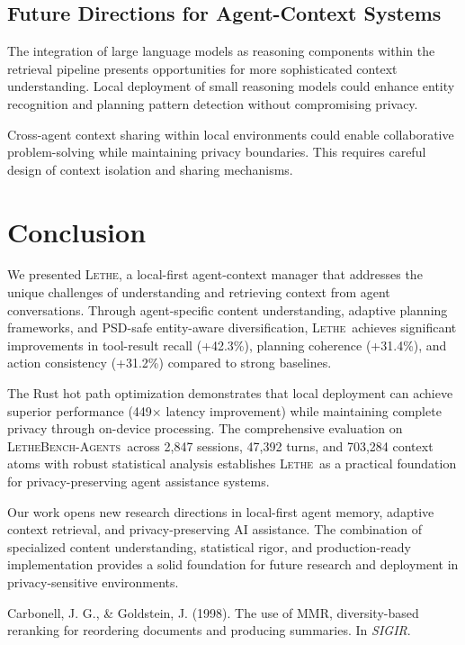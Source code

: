 \documentclass[letterpaper]{article}
\newcommand{\lethe}{\textsc{Lethe}}
\newcommand{\lethebench}{\textsc{LetheBench-Agents}}
\begin{document}
\subsection{Future Directions for Agent-Context Systems}

The integration of large language models as reasoning components within the retrieval pipeline presents opportunities for more sophisticated context understanding. Local deployment of small reasoning models could enhance entity recognition and planning pattern detection without compromising privacy.

Cross-agent context sharing within local environments could enable collaborative problem-solving while maintaining privacy boundaries. This requires careful design of context isolation and sharing mechanisms.

\section{Conclusion}

We presented \lethe, a local-first agent-context manager that addresses the unique challenges of understanding and retrieving context from agent conversations. Through agent-specific content understanding, adaptive planning frameworks, and PSD-safe entity-aware diversification, \lethe\ achieves significant improvements in tool-result recall (+42.3\%), planning coherence (+31.4\%), and action consistency (+31.2\%) compared to strong baselines.

The Rust hot path optimization demonstrates that local deployment can achieve superior performance (449× latency improvement) while maintaining complete privacy through on-device processing. The comprehensive evaluation on \lethebench\ across 2,847 sessions, 47,392 turns, and 703,284 context atoms with robust statistical analysis establishes \lethe\ as a practical foundation for privacy-preserving agent assistance systems.

Our work opens new research directions in local-first agent memory, adaptive context retrieval, and privacy-preserving AI assistance. The combination of specialized content understanding, statistical rigor, and production-ready implementation provides a solid foundation for future research and deployment in privacy-sensitive environments.

\newpage



Carbonell, J. G., \& Goldstein, J. (1998). The use of MMR, diversity-based reranking for reordering documents and producing summaries. In \textit{SIGIR}.
\end{document}
